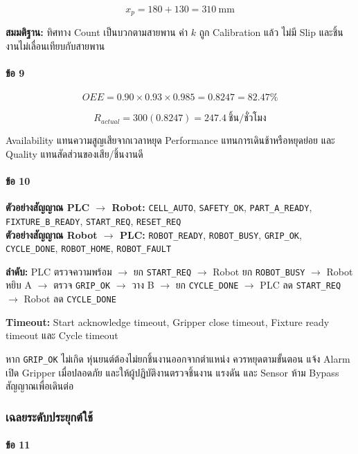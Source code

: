 \[
x_p=180+130=310\ \text{mm}
\]

\textbf{สมมติฐาน:} ทิศทาง Count เป็นบวกตามสายพาน ค่า $k$ ถูก Calibration แล้ว ไม่มี Slip และชิ้นงานไม่เลื่อนเทียบกับสายพาน

\paragraph{ข้อ 9}

\[
OEE=0.90\times0.93\times0.985=0.8247=82.47\%
\]

\[
R_{actual}=300(0.8247)=247.4\ \text{ชิ้น/ชั่วโมง}
\]

Availability แทนความสูญเสียจากเวลาหยุด Performance แทนการเดินช้าหรือหยุดย่อย และ Quality แทนสัดส่วนของเสีย/ชิ้นงานดี

\paragraph{ข้อ 10}

\textbf{ตัวอย่างสัญญาณ PLC \(\rightarrow\) Robot:} \texttt{CELL\_AUTO}, \texttt{SAFETY\_OK}, \texttt{PART\_A\_READY}, \texttt{FIXTURE\_B\_READY}, \texttt{START\_REQ}, \texttt{RESET\_REQ}\\
\textbf{ตัวอย่างสัญญาณ Robot \(\rightarrow\) PLC:} \texttt{ROBOT\_READY}, \texttt{ROBOT\_BUSY}, \texttt{GRIP\_OK}, \texttt{CYCLE\_DONE}, \texttt{ROBOT\_HOME}, \texttt{ROBOT\_FAULT}

\textbf{ลำดับ:} PLC ตรวจความพร้อม \(\rightarrow\) ยก \texttt{START\_REQ} \(\rightarrow\) Robot ยก \texttt{ROBOT\_BUSY} \(\rightarrow\) Robot หยิบ A \(\rightarrow\) ตรวจ \texttt{GRIP\_OK} \(\rightarrow\) วาง B \(\rightarrow\) ยก \texttt{CYCLE\_DONE} \(\rightarrow\) PLC ลด \texttt{START\_REQ} \(\rightarrow\) Robot ลด \texttt{CYCLE\_DONE}

\textbf{Timeout:} Start acknowledge timeout, Gripper close timeout, Fixture ready timeout และ Cycle timeout

หาก \texttt{GRIP\_OK} ไม่เกิด หุ่นยนต์ต้องไม่ยกชิ้นงานออกจากตำแหน่ง ควรหยุดตามขั้นตอน แจ้ง Alarm เปิด Gripper เมื่อปลอดภัย และให้ผู้ปฏิบัติงานตรวจชิ้นงาน แรงดัน และ Sensor ห้าม Bypass สัญญาณเพื่อเดินต่อ

\subsubsection{เฉลยระดับประยุกต์ใช้}

\paragraph{ข้อ 11}

